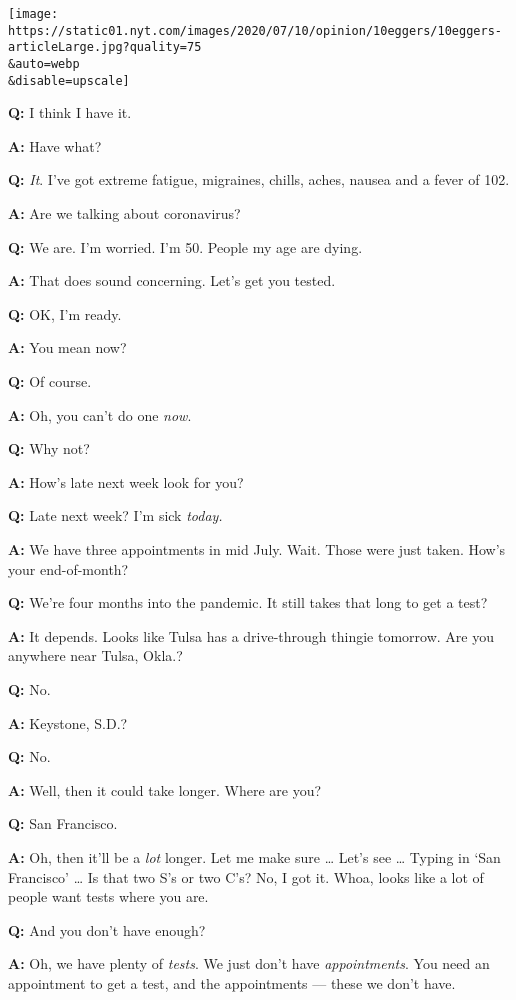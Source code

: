 \texttt{[image: https://static01.nyt.com/images/2020/07/10/opinion/10eggers/10eggers-articleLarge.jpg?quality=75\\\&auto=webp\\\&disable=upscale]}

\textbf{Q:} I think I have it.

\textbf{A:} Have what?

\textbf{Q:} \emph{It}. I've got extreme fatigue, migraines, chills,
aches, nausea and a fever of 102.

\textbf{A:} Are we talking about coronavirus?

\textbf{Q:} We are. I'm worried. I'm 50. People my age are dying.

\textbf{A:} That does sound concerning. Let's get you tested.

\textbf{Q:} OK, I'm ready.

\textbf{A:} You mean now?

\textbf{Q:} Of course.

\textbf{A:} Oh, you can't do one \emph{now}.

\textbf{Q:} Why not?

\textbf{A:} How's late next week look for you?

\textbf{Q:} Late next week? I'm sick \emph{today.}

\textbf{A:} We have three appointments in mid July. Wait. Those were
just taken. How's your end-of-month?

\textbf{Q:} We're four months into the pandemic. It still takes that
long to get a test?

\textbf{A:} It depends. Looks like Tulsa has a drive-through thingie
tomorrow. Are you anywhere near Tulsa, Okla.?

\textbf{Q:} No.

\textbf{A:} Keystone, S.D.?

\textbf{Q:} No.

\textbf{A:} Well, then it could take longer. Where are you?

\textbf{Q:} San Francisco.

\textbf{A:} Oh, then it'll be a \emph{lot} longer. Let me make sure
\ldots{} Let's see \ldots{} Typing in `San Francisco' \ldots{} Is that
two S's or two C's? No, I got it. Whoa, looks like a lot of people want
tests where you are.

\textbf{Q:} And you don't have enough?

\textbf{A:} Oh, we have plenty of \emph{tests}. We just don't have
\emph{appointments}. You need an appointment to get a test, and the
appointments --- these we don't have.

